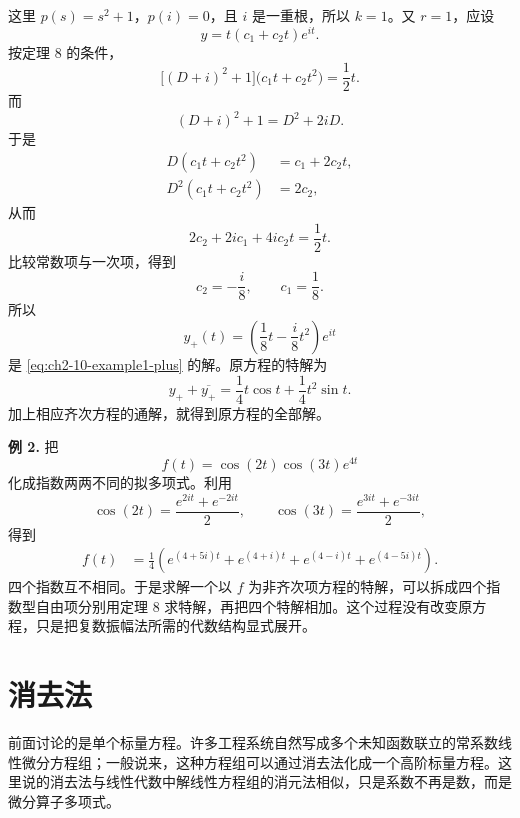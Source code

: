 这里 \(p(s)=s^2+1\)，\(p(i)=0\)，且 \(i\) 是一重根，所以 \(k=1\)。又 \(r=1\)，应设
\begin{equation}
 y=t(c_1+c_2t)e^{it}.
 \label{eq:ch2-10-example1-ansatz}
 \end{equation}
按定理 8 的条件，
\begin{equation}
 \bigl[(D+i)^2+1\bigr]\bigl(c_1t+c_2t^2\bigr)=\frac12t.
 \label{eq:ch2-10-example1-shifted}
\end{equation}
而
\[
 (D+i)^2+1=D^2+2iD.
\]
于是
\begin{align*}
 D(c_1t+c_2t^2)&=c_1+2c_2t,\\
 D^2(c_1t+c_2t^2)&=2c_2,
 \end{align*}
从而
\begin{equation}
 2c_2+2ic_1+4ic_2t=\frac12t.
 \label{eq:ch2-10-example1-coefficients}
\end{equation}
比较常数项与一次项，得到
\[
 c_2=-\frac{i}{8},\qquad c_1=\frac18.
\]
所以
\begin{equation}
 y_+(t)=\left(\frac18t-\frac{i}{8}t^2\right)e^{it}
 \label{eq:ch2-10-example1-plus-solution}
\end{equation}
是 \eqref{eq:ch2-10-example1-plus} 的解。原方程的特解为
\begin{equation}
 y_++\overline{y_+}
 =\frac14t\cos t+\frac14t^2\sin t.
 \label{eq:ch2-10-example1-particular}
\end{equation}
加上相应齐次方程的通解，就得到原方程的全部解。

\noindent\textbf{例 2.}
把
\begin{equation}
 f(t)=\cos(2t)\cos(3t)e^{4t}
 \label{eq:ch2-10-example2}
\end{equation}
化成指数两两不同的拟多项式。利用
\[
 \cos(2t)=\frac{e^{2it}+e^{-2it}}2,
 \qquad
 \cos(3t)=\frac{e^{3it}+e^{-3it}}2,
\]
得到
\begin{align}
 f(t)
 &=\frac14\left(e^{(4+5i)t}+e^{(4+i)t}
   +e^{(4-i)t}+e^{(4-5i)t}\right).
 \label{eq:ch2-10-example2-expanded}
\end{align}
四个指数互不相同。于是求解一个以 \(f\) 为非齐次项方程的特解，可以拆成四个指数型自由项分别用定理 8 求特解，再把四个特解相加。这个过程没有改变原方程，只是把复数振幅法所需的代数结构显式展开。

\section{消去法}

前面讨论的是单个标量方程。许多工程系统自然写成多个未知函数联立的常系数线性微分方程组；一般说来，这种方程组可以通过消去法化成一个高阶标量方程。这里说的消去法与线性代数中解线性方程组的消元法相似，只是系数不再是数，而是微分算子多项式。

